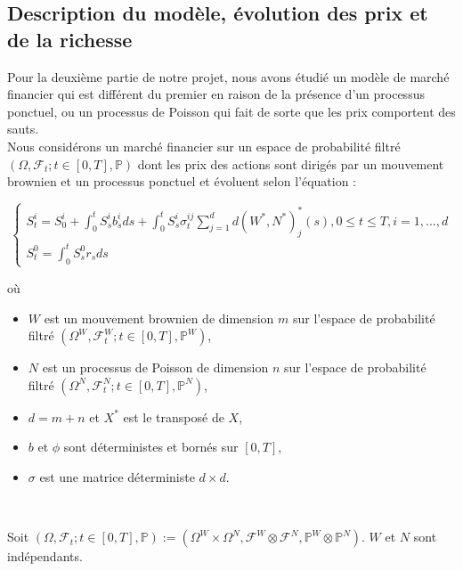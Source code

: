 \documentclass[11pt,letterpaper]{article}
\begin{document}
\subsection{Description du modèle, évolution des prix et de la richesse}
Pour la deuxième partie de notre projet, nous avons étudié un modèle de marché financier qui est différent du premier en raison de la présence d'un processus ponctuel, ou un processus de Poisson qui fait de sorte que les prix comportent des sauts.\\

Nous considérons un marché financier sur un espace de probabilité filtré $(\Omega, \mathcal{F}_t; t \in [0, T], \mathbb{P})$ dont les prix des actions sont dirigés par un mouvement brownien et un processus ponctuel et évoluent selon l'équation : 

\begin{equation}
\begin{cases}S_t^i = S_0^i + \int_{0}^{t}S_s^i b_s^i ds + \int_{0}^{t}S_s^i \sigma^{ij}_t \sum_{j = 1}^{d} d(W^*, N^*)^{*}_j(s), 0 \leq t \leq T, i = 1, ..., d \\
S^0_t = \int_{0}^{t} S^0_s r_s ds \end{cases}
\end{equation}

où\\

\begin{itemize} 
\item $W$ est un mouvement brownien de dimension $m$ sur l'espace de probabilité filtré $(\Omega^W, \mathcal{F}^W_t; t \in [0, T], \mathbb{P}^W)$,
\item $N$ est un processus de Poisson de dimension $n$ sur l'espace de probabilité filtré $(\Omega^N, \mathcal{F}^N_t; t \in [0, T], \mathbb{P}^N)$,
\item $d = m+n$ et $X^*$ est le transposé de $X$,
\item $b$ et $\phi$ sont déterministes et bornés sur $[0, T]$,
\item $\sigma$ est une matrice déterministe $d \times d$.
\end{itemize}
\

Soit $(\Omega, \mathcal{F}_t; t\in [0, T], \mathbb{P}) := (\Omega^W \times \Omega^N, \mathcal{F}^W \otimes \mathcal{F}^N, \mathbb{P}^W \otimes \mathbb{P}^N)$. $W$ et $N$ sont indépendants. \\
\end{document}
